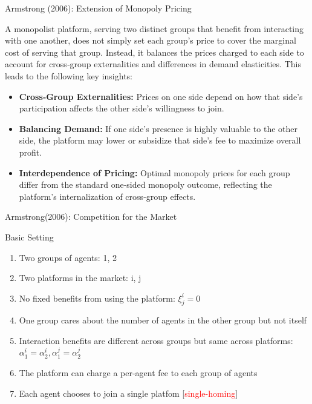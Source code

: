 \documentclass[aspectratio=169]{beamer}  %
\begin{document}
\begin{frame}{Armstrong (2006): Extension of Monopoly Pricing}
    \justifying  %
    
    A monopolist platform, serving two distinct groups that benefit from interacting 
    with one another, does not simply set each group’s price to cover the marginal 
    cost of serving that group. Instead, it balances the prices charged to each side 
    to account for cross‐group externalities and differences in demand elasticities.
    This leads to the following key insights:
    
    \begin{itemize}
        \item \textbf{Cross‐Group Externalities:} Prices on one side depend on how 
        that side’s participation affects the other side’s willingness to join.
    
        \item \textbf{Balancing Demand:} If one side’s presence is highly valuable 
        to the other side, the platform may lower or subsidize that side’s fee 
        to maximize overall profit.
    
        \item \textbf{Interdependence of Pricing:} Optimal monopoly prices for each 
        group differ from the standard one‐sided monopoly outcome, reflecting 
        the platform’s internalization of cross‐group effects.
    \end{itemize}
    
\end{frame}

\begin{frame}{Armstrong(2006): Competition for the Market}
    \begin{block}{Basic Setting}
        \begin{enumerate}
            \item Two groups of agents: 1, 2
            \item Two platforms in the market: i, j
            \item No fixed benefits from using the platform: $\xi_{j}^{i} = 0$
            \item One group cares about the number of agents in the other group but not itself
            \item Interaction benefits are different across groups but same across platforms: $\alpha_{1}^{i} = \alpha_{2}^{i}, \alpha_{1}^{j} = \alpha_{2}^{j}$
            \item The platform can charge a per-agent fee to each group of agents
            \item Each agent chooses to join a single platfom [\textcolor{red}{single-homing}]
        \end{enumerate}
    \end{block}
\end{frame}
\end{document}
